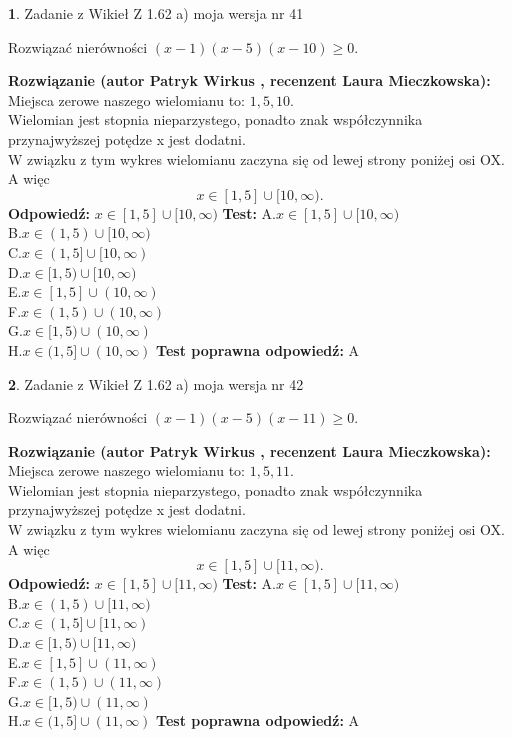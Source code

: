 \documentclass[12pt, a4paper]{article}
\theoremstyle{definition} %
\newtheorem{zad}{}
\newcommand{\zadStart}[1]{\begin{zad}#1\newline}
\newcommand{\zadStop}{\end{zad}}
\newcommand{\rozwStart}[2]{\noindent \textbf{Rozwiązanie (autor #1 , recenzent #2): }\newline}
\newcommand{\rozwStop}{\newline}
\newcommand{\odpStart}{\noindent \textbf{Odpowiedź:}\newline}
\newcommand{\odpStop}{\newline}
\newcommand{\testStart}{\noindent \textbf{Test:}\newline}
\newcommand{\testStop}{\newline}
\newcommand{\kluczStart}{\noindent \textbf{Test poprawna odpowiedź:}\newline}
\newcommand{\kluczStop}{\newline}
\begin{document}
\zadStart{Zadanie z Wikieł Z 1.62 a) moja wersja nr 41}

Rozwiązać nierówności $(x-1)(x-5)(x-10)\ge0$.
\zadStop
\rozwStart{Patryk Wirkus}{Laura Mieczkowska}
Miejsca zerowe naszego wielomianu to: $1, 5, 10$.\\
Wielomian jest stopnia nieparzystego, ponadto znak współczynnika przy\linebreak najwyższej potędze x jest dodatni.\\ W związku z tym wykres wielomianu zaczyna się od lewej strony poniżej osi OX. A więc $$x \in [1,5] \cup [10,\infty).$$
\rozwStop
\odpStart
$x \in [1,5] \cup [10,\infty)$
\odpStop
\testStart
A.$x \in [1,5] \cup [10,\infty)$\\
B.$x \in (1,5) \cup [10,\infty)$\\
C.$x \in (1,5] \cup [10,\infty)$\\
D.$x \in [1,5) \cup [10,\infty)$\\
E.$x \in [1,5] \cup (10,\infty)$\\
F.$x \in (1,5) \cup (10,\infty)$\\
G.$x \in [1,5) \cup (10,\infty)$\\
H.$x \in (1,5] \cup (10,\infty)$
\testStop
\kluczStart
A
\kluczStop



\zadStart{Zadanie z Wikieł Z 1.62 a) moja wersja nr 42}

Rozwiązać nierówności $(x-1)(x-5)(x-11)\ge0$.
\zadStop
\rozwStart{Patryk Wirkus}{Laura Mieczkowska}
Miejsca zerowe naszego wielomianu to: $1, 5, 11$.\\
Wielomian jest stopnia nieparzystego, ponadto znak współczynnika przy\linebreak najwyższej potędze x jest dodatni.\\ W związku z tym wykres wielomianu zaczyna się od lewej strony poniżej osi OX. A więc $$x \in [1,5] \cup [11,\infty).$$
\rozwStop
\odpStart
$x \in [1,5] \cup [11,\infty)$
\odpStop
\testStart
A.$x \in [1,5] \cup [11,\infty)$\\
B.$x \in (1,5) \cup [11,\infty)$\\
C.$x \in (1,5] \cup [11,\infty)$\\
D.$x \in [1,5) \cup [11,\infty)$\\
E.$x \in [1,5] \cup (11,\infty)$\\
F.$x \in (1,5) \cup (11,\infty)$\\
G.$x \in [1,5) \cup (11,\infty)$\\
H.$x \in (1,5] \cup (11,\infty)$
\testStop
\kluczStart
A
\kluczStop
\end{document}
